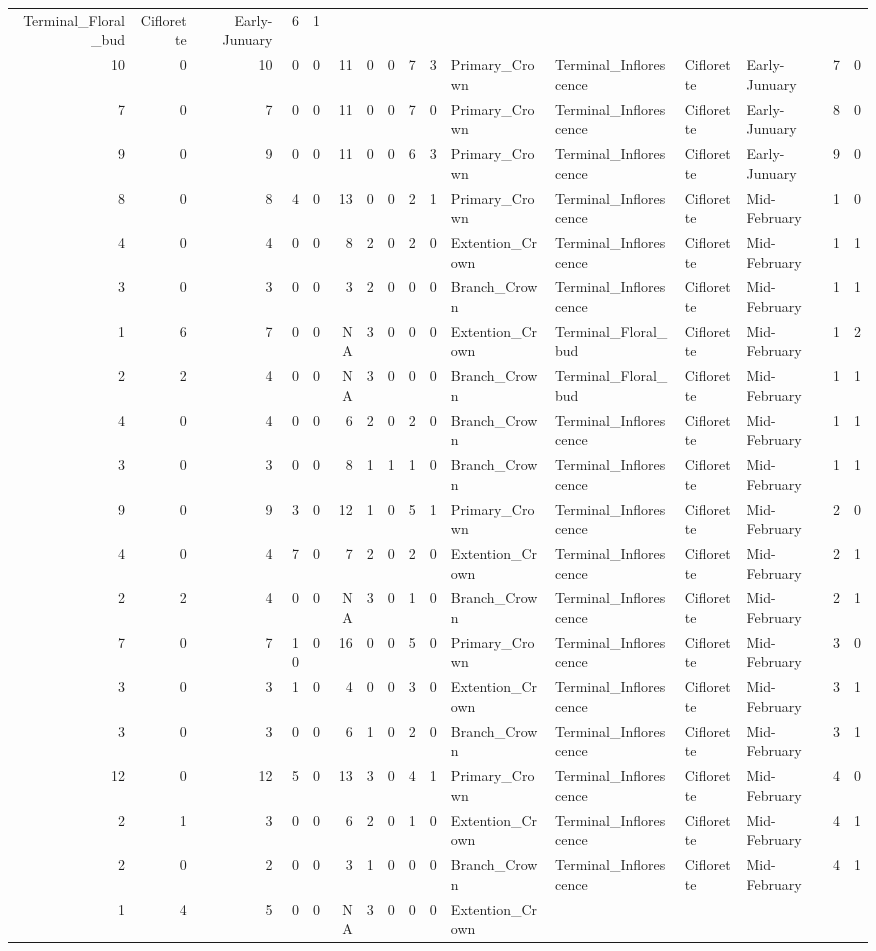 \documentclass[]{article}
\begin{document}
\begin{longtable}[]{@{}rrrrrrrrrrllllrl@{}}
Terminal\_Floral\_bud & Ciflorette & Early-Junuary & 6 &
1\tabularnewline
10 & 0 & 10 & 0 & 0 & 11 & 0 & 0 & 7 & 3 & Primary\_Crown &
Terminal\_Inflorescence & Ciflorette & Early-Junuary & 7 &
0\tabularnewline
7 & 0 & 7 & 0 & 0 & 11 & 0 & 0 & 7 & 0 & Primary\_Crown &
Terminal\_Inflorescence & Ciflorette & Early-Junuary & 8 &
0\tabularnewline
9 & 0 & 9 & 0 & 0 & 11 & 0 & 0 & 6 & 3 & Primary\_Crown &
Terminal\_Inflorescence & Ciflorette & Early-Junuary & 9 &
0\tabularnewline
8 & 0 & 8 & 4 & 0 & 13 & 0 & 0 & 2 & 1 & Primary\_Crown &
Terminal\_Inflorescence & Ciflorette & Mid-February & 1 &
0\tabularnewline
4 & 0 & 4 & 0 & 0 & 8 & 2 & 0 & 2 & 0 & Extention\_Crown &
Terminal\_Inflorescence & Ciflorette & Mid-February & 1 &
1\tabularnewline
3 & 0 & 3 & 0 & 0 & 3 & 2 & 0 & 0 & 0 & Branch\_Crown &
Terminal\_Inflorescence & Ciflorette & Mid-February & 1 &
1\tabularnewline
1 & 6 & 7 & 0 & 0 & NA & 3 & 0 & 0 & 0 & Extention\_Crown &
Terminal\_Floral\_bud & Ciflorette & Mid-February & 1 & 2\tabularnewline
2 & 2 & 4 & 0 & 0 & NA & 3 & 0 & 0 & 0 & Branch\_Crown &
Terminal\_Floral\_bud & Ciflorette & Mid-February & 1 & 1\tabularnewline
4 & 0 & 4 & 0 & 0 & 6 & 2 & 0 & 2 & 0 & Branch\_Crown &
Terminal\_Inflorescence & Ciflorette & Mid-February & 1 &
1\tabularnewline
3 & 0 & 3 & 0 & 0 & 8 & 1 & 1 & 1 & 0 & Branch\_Crown &
Terminal\_Inflorescence & Ciflorette & Mid-February & 1 &
1\tabularnewline
9 & 0 & 9 & 3 & 0 & 12 & 1 & 0 & 5 & 1 & Primary\_Crown &
Terminal\_Inflorescence & Ciflorette & Mid-February & 2 &
0\tabularnewline
4 & 0 & 4 & 7 & 0 & 7 & 2 & 0 & 2 & 0 & Extention\_Crown &
Terminal\_Inflorescence & Ciflorette & Mid-February & 2 &
1\tabularnewline
2 & 2 & 4 & 0 & 0 & NA & 3 & 0 & 1 & 0 & Branch\_Crown &
Terminal\_Inflorescence & Ciflorette & Mid-February & 2 &
1\tabularnewline
7 & 0 & 7 & 10 & 0 & 16 & 0 & 0 & 5 & 0 & Primary\_Crown &
Terminal\_Inflorescence & Ciflorette & Mid-February & 3 &
0\tabularnewline
3 & 0 & 3 & 1 & 0 & 4 & 0 & 0 & 3 & 0 & Extention\_Crown &
Terminal\_Inflorescence & Ciflorette & Mid-February & 3 &
1\tabularnewline
3 & 0 & 3 & 0 & 0 & 6 & 1 & 0 & 2 & 0 & Branch\_Crown &
Terminal\_Inflorescence & Ciflorette & Mid-February & 3 &
1\tabularnewline
12 & 0 & 12 & 5 & 0 & 13 & 3 & 0 & 4 & 1 & Primary\_Crown &
Terminal\_Inflorescence & Ciflorette & Mid-February & 4 &
0\tabularnewline
2 & 1 & 3 & 0 & 0 & 6 & 2 & 0 & 1 & 0 & Extention\_Crown &
Terminal\_Inflorescence & Ciflorette & Mid-February & 4 &
1\tabularnewline
2 & 0 & 2 & 0 & 0 & 3 & 1 & 0 & 0 & 0 & Branch\_Crown &
Terminal\_Inflorescence & Ciflorette & Mid-February & 4 &
1\tabularnewline
1 & 4 & 5 & 0 & 0 & NA & 3 & 0 & 0 & 0 & Extention\_Crown &

\end{longtable}
\end{document}
